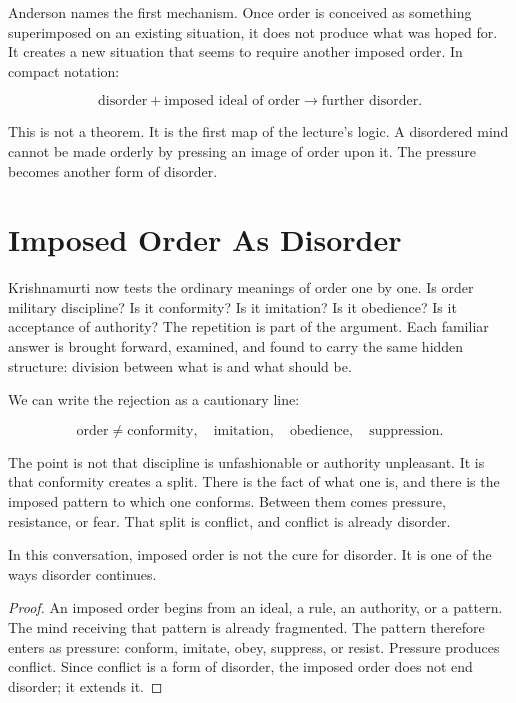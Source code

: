 Anderson names the first mechanism. Once order is conceived as something superimposed on an existing situation, it does not produce what was hoped for. It creates a new situation that seems to require another imposed order. In compact notation:

\begin{equation}
\text{disorder}+\text{imposed ideal of order}
\longrightarrow
\text{further disorder}.
\end{equation}

This is not a theorem. It is the first map of the lecture's logic. A disordered mind cannot be made orderly by pressing an image of order upon it. The pressure becomes another form of disorder.

\section{Imposed Order As Disorder}

Krishnamurti now tests the ordinary meanings of order one by one. Is order military discipline? Is it conformity? Is it imitation? Is it obedience? Is it acceptance of authority? The repetition is part of the argument. Each familiar answer is brought forward, examined, and found to carry the same hidden structure: division between what is and what should be.

We can write the rejection as a cautionary line:

\begin{equation}
\text{order}\neq
\text{conformity},\quad
\text{imitation},\quad
\text{obedience},\quad
\text{suppression}.
\end{equation}

The point is not that discipline is unfashionable or authority unpleasant. It is that conformity creates a split. There is the fact of what one is, and there is the imposed pattern to which one conforms. Between them comes pressure, resistance, or fear. That split is conflict, and conflict is already disorder.

\begin{proposition}
In this conversation, imposed order is not the cure for disorder. It is one of the ways disorder continues.
\end{proposition}

\begin{proof}
An imposed order begins from an ideal, a rule, an authority, or a pattern. The mind receiving that pattern is already fragmented. The pattern therefore enters as pressure: conform, imitate, obey, suppress, or resist. Pressure produces conflict. Since conflict is a form of disorder, the imposed order does not end disorder; it extends it.
\end{proof}

